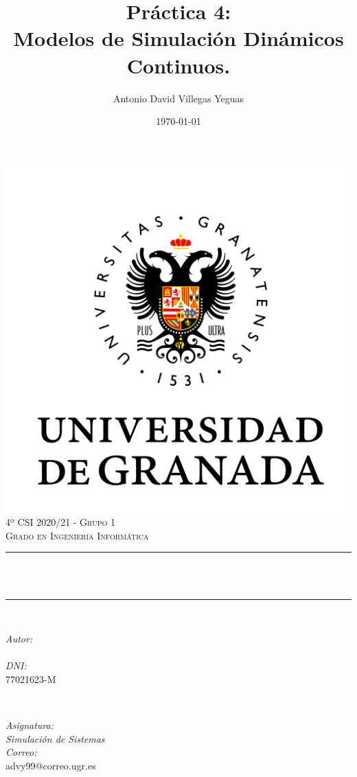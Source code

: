 \documentclass[12pt, spanish]{article}
\title{Práctica 4:\\
Modelos de Simulación Dinámicos Continuos.\hspace{0.05cm} }
\author{Antonio David Villegas Yeguas}
\date{\today}
\makeatletter
\let\thetitle\@title
\let\theauthor\@author
\makeatother
\begin{document}

\begin{titlepage}
    \centering
    \vspace*{0.3 cm}
    \includegraphics[scale = 0.50]{ugr.png}\\[0.7 cm]
    \textsc{\large 4º CSI 2020/21 - Grupo 1}\\[0.5 cm]
    \textsc{\large Grado en Ingeniería Informática}\\[0.5 cm]
    \rule{\linewidth}{0.2 mm} \\[0.2 cm]
    { \huge \bfseries \thetitle}\\
    \rule{\linewidth}{0.2 mm} \\[1 cm]

    \begin{minipage}{0.4\textwidth}
        \begin{flushleft} \large
            \emph{Autor:}\\
            \theauthor\\
			 \emph{DNI:}\\
            77021623-M
            \end{flushleft}
            \end{minipage}~
            \begin{minipage}{0.4\textwidth}
            \begin{flushright} \large
            \emph{Asignatura: \\
            Simulación de Sistemas}   \\
            \emph{Correo:}\\
            advy99@correo.ugr.es
        \end{flushright}
    \end{minipage}\\[0.5cm]


\end{titlepage}
\end{document}
